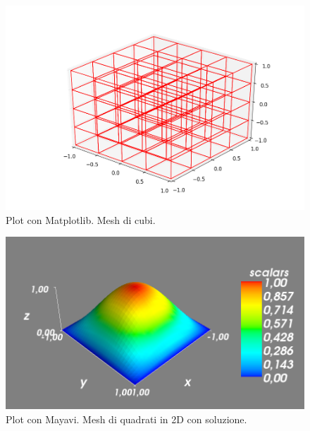 \documentclass[oneside,12pt]{book}  %
\theoremstyle{plain}
\theoremstyle{definition}
\theoremstyle{remark}
\numberwithin{equation}{chapter} %
\begin{document}
\begin{figure}[h]
\label{img:matplotlibMesh}
\centering
\includegraphics[scale=0.4]{Immagini/Project/matplotlibPlotMesh.png}
\caption{Plot con Matplotlib. Mesh di cubi.}
\end{figure}

\begin{figure}[h]
\label{img:mayavi2D}
\centering
\includegraphics[scale=0.4]{Immagini/Project/mayavi2D.png}
\caption{Plot con Mayavi. Mesh di quadrati in 2D con soluzione.}
\end{figure}
\end{document}
